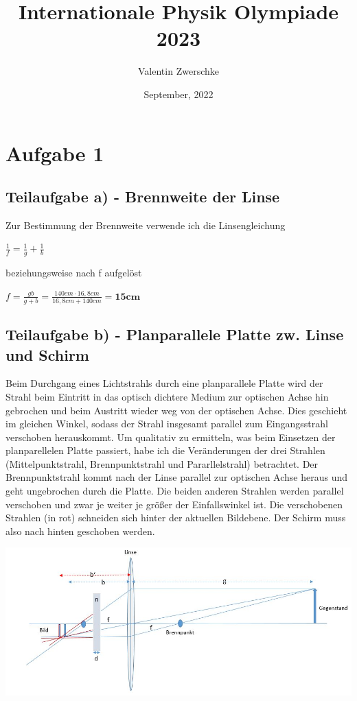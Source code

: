 \documentclass{article}
\title{Internationale Physik Olympiade 2023}
\author{Valentin Zwerschke}
\date{September, 2022}
\begin{document}
\maketitle
\section*{Aufgabe 1}
\subsection*{Teilaufgabe a) - Brennweite der Linse}
Zur Bestimmung der Brennweite verwende ich die Linsengleichung
\begin{center}
	$\frac{1}{f}=\frac{1}{g}+\frac{1}{b}$
\end{center}
beziehungsweise nach f aufgelöst
\begin{center}
	$f=\frac{gb}{g+b}=\frac{140cm\cdot16,8cm}{16,8cm+140cm}=\textbf{15cm}$
\end{center}
\subsection*{Teilaufgabe b) - Planparallele Platte zw. Linse und Schirm}
Beim Durchgang eines Lichtstrahls durch eine planparallele Platte wird der Strahl beim Eintritt in das optisch dichtere
Medium zur optischen Achse hin gebrochen und beim Austritt wieder weg von der optischen Achse. Dies geschieht im gleichen Winkel, 
sodass der Strahl insgesamt parallel zum Eingangsstrahl verschoben herauskommt.   
Um qualitativ zu ermitteln, was beim Einsetzen der planparellelen Platte passiert, habe ich die Veränderungen der drei Strahlen (Mittelpunktstrahl, Brennpunktstrahl und Pararllelstrahl) betrachtet.
Der Brennpunktstrahl kommt nach der Linse parallel zur optischen Achse heraus und geht ungebrochen durch die Platte. Die beiden anderen Strahlen werden parallel verschoben und zwar je weiter je größer der Einfallswinkel ist. 
Die verschobenen Strahlen (in rot) schneiden sich hinter der aktuellen Bildebene. Der Schirm muss also nach hinten geschoben werden.
\begin{center}
	\includegraphics[scale=0.45]{Linse.JPG}
\end{center}
\end{document}
